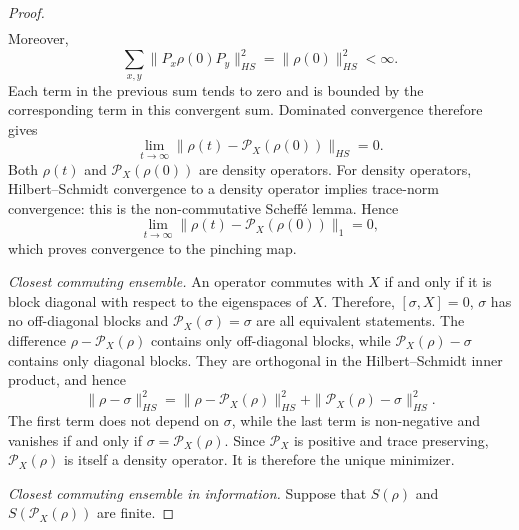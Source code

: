 \documentclass{techbrief}
\begin{document}
\begin{proof}
\begin{align}
	\end{align}
	Moreover,
	\begin{equation}
		\sum_{x,y}\|P_x\rho(0)P_y\|^2_{HS}=\|\rho(0)\|^2_{HS}<\infty.
	\end{equation}
	Each term in the previous sum tends to zero and is bounded by the corresponding term in this convergent sum. Dominated convergence therefore gives
	\begin{equation}
		\lim\limits_{t\to\infty}\|\rho(t)-\mathcal{P}_X(\rho(0))\|_{HS}=0.
	\end{equation}
	Both $\rho(t)$ and $\mathcal{P}_X(\rho(0))$ are density operators. For density operators, Hilbert--Schmidt convergence to a density operator implies trace-norm convergence: this is the non-commutative Scheff\'e lemma. Hence
	\begin{equation}
		\lim\limits_{t\to\infty}\|\rho(t)-\mathcal{P}_X(\rho(0))\|_1=0,
	\end{equation}
	which proves convergence to the pinching map.

	\emph{Closest commuting ensemble.} An operator commutes with $X$ if and only if it is block diagonal with respect to the eigenspaces of $X$. Therefore, $[\sigma,X]=0$, $\sigma$ has no off-diagonal blocks and $\mathcal{P}_X(\sigma)=\sigma$ are all equivalent statements. The difference $\rho-\mathcal{P}_X(\rho)$ contains only off-diagonal blocks, while $\mathcal{P}_X(\rho)-\sigma$ contains only diagonal blocks. They are orthogonal in the Hilbert--Schmidt inner product, and hence
	\begin{equation}
		\|\rho-\sigma\|^2_{HS}=\|\rho-\mathcal{P}_X(\rho)\|^2_{HS}+\|\mathcal{P}_X(\rho)-\sigma\|^2_{HS}.
	\end{equation}
	The first term does not depend on $\sigma$, while the last term is non-negative and vanishes if and only if $\sigma=\mathcal{P}_X(\rho)$. Since $\mathcal{P}_X$ is positive and trace preserving, $\mathcal{P}_X(\rho)$ is itself a density operator. It is therefore the unique minimizer.

	\emph{Closest commuting ensemble in information.} Suppose that $S(\rho)$ and $S(\mathcal{P}_X(\rho))$ are finite.
	

\end{proof}
\end{document}
